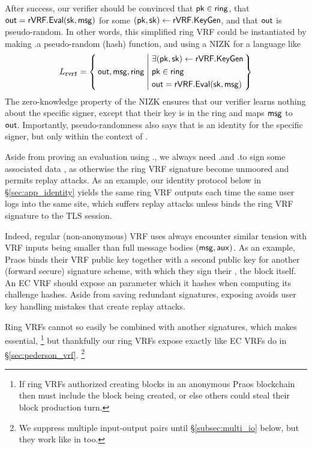 After success, our verifier should be convinced that $\mathsf{pk} \in \mathsf{ring}$, that
${\mathsf{out}} = {\mathsf{rVRF}}.{\mathsf{Eval}}(\mathsf{sk},\mathsf{msg})$ for some $(\mathsf{pk},\mathsf{sk}) \leftarrow {\ensuremath{\mathsf{rVRF}}}.{\mathsf{KeyGen}}$,
 and that ${\mathsf{out}}$ is pseudo-random.
In other words, this simplified ring VRF could be instantiated by making
\rVRF.\Eval a pseudo-random (hash) function, and using a NIZK for a language like
$$ \Lrvrf = \Setst{ \Out, \msg, \ring}{
    \eprint{
        \exists (\pk,\sk) \leftarrow \rVRF.\KeyGen, \quad %
        \pk \in \ring, \quad
        \Out = \rVRF.\Eval(\sk,\msg)
    }{
        \begin{aligned}
        & \exists (\pk,\sk) \leftarrow \rVRF.\KeyGen \\
        & \pk \in \ring \\
        & \Out = \rVRF.\Eval(\sk,\msg)
        \end{aligned}
    }
} $$
The zero-knowledge property of the NIZK ensures that our verifier learns nothing about the specific
signer, except that their key is in the ring and maps $\mathsf{msg}$ to ${\mathsf{out}}$.
Importantly, pseudo-randomness also says that \Out is an identity
for the specific signer, but only within the context of \msg.


Aside from proving an evaluation using \rVRF.\Eval, 
we always need \rVRF.\Sign and \rVRF.\Verify to sign some associated data \aux,
as otherwise the ring VRF signature become unmoored and permits replay attacks.
%
As an example, our identity protocol below in \S\ref{sec:app_identity}
yields the same ring VRF outputs each time the same user logs into the
same site, which suffers replay attacks unless \aux binds the
ring VRF signature to the TLS session.

Indeed, regular (non-anonymous) VRF uses always encounter similar tension
with VRF inputs \msg being smaller than full message bodies $(\mathsf{msg},\mathsf{aux})$.
As an example, Praos \cite{praos} binds their VRF public key together
with a second public key for another (forward secure) signature scheme,
with which they sign their \aux, the block itself.
%
An EC VRF should expose an \aux parameter which it hashes when computing
its challenge hashes.  Aside from saving redundant signatures, exposing
\aux avoids user key handling mistakes that create replay attacks.

Ring VRFs cannot so easily be combined with another signatures, which
makes \aux essential,%
\footnote{If ring VRFs authorized creating blocks in an anonymous Praos blockchain then \aux must include the block being created, or else others could steal their block production turn.}
but thankfully our ring VRFs expose \aux exactly like EC VRFs do in \S\ref{sec:pederson_vrf}.%
\footnote{We suppress multiple input-output pairs until \S\ref{subsec:multi_io} below, but they work like in \cite{PrivacyPass} too.}

